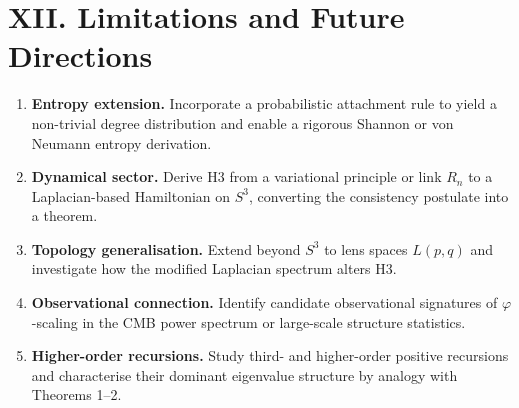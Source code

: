 \documentclass[12pt]{article}
\newcommand{\ph}{\varphi}
\begin{document}
\section*{XII. Limitations and Future Directions}
\begin{enumerate}[leftmargin=2em]
    \item \textbf{Entropy extension.} Incorporate a probabilistic attachment rule to yield a non-trivial degree distribution and enable a rigorous Shannon or von Neumann entropy derivation.
    \item \textbf{Dynamical sector.} Derive H3 from a variational principle or link $R_n$ to a Laplacian-based Hamiltonian on $S^3$, converting the consistency postulate into a theorem.
    \item \textbf{Topology generalisation.} Extend beyond $S^3$ to lens spaces $L(p,q)$ and investigate how the modified Laplacian spectrum alters H3.
    \item \textbf{Observational connection.} Identify candidate observational signatures of $\ph$-scaling in the CMB power spectrum or large-scale structure statistics.
    \item \textbf{Higher-order recursions.} Study third- and higher-order positive recursions and characterise their dominant eigenvalue structure by analogy with Theorems 1--2.
\end{enumerate}
\end{document}
